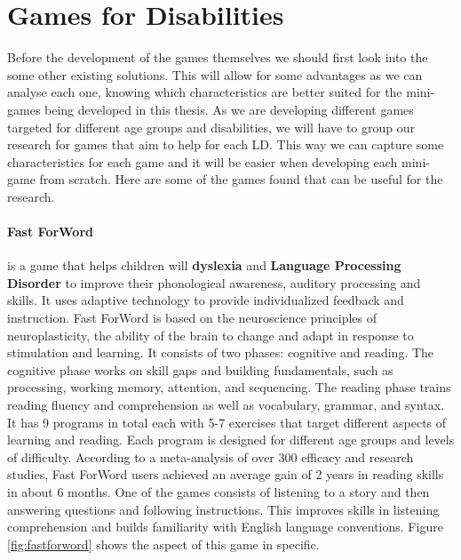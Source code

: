 \section{Games for Disabilities}
\label{sec:gamesforld}

Before the development of the games themselves we should first look into the some other existing solutions. This will allow for some advantages as we can analyse each one, knowing which characteristics are better suited for the mini-games being developed in this thesis.
As we are developing different games targeted for different age groups and disabilities, we will have to group our research for games that aim to help for each LD. This way we can capture some characteristics for each game and it will be easier when developing each mini-game from scratch.
Here are some of the games found that can be useful for the research.

\paragraph{Fast ForWord} is a game that helps children will \textbf{dyslexia} and \textbf{Language Processing Disorder} to improve their phonological awareness, auditory processing and skills. It uses adaptive technology to provide individualized feedback and instruction.
Fast  ForWord is based on the neuroscience principles of neuroplasticity, the ability of the brain to change and adapt in response to stimulation and learning. It consists of two phases: cognitive and reading. The cognitive phase works on skill gaps and building fundamentals, such as processing, working memory, attention, and sequencing. The reading phase trains reading fluency and comprehension as well as vocabulary, grammar, and syntax. It has 9 programs in total each with 5-7 exercises that target different aspects of learning and reading. Each program is designed for different age groups and levels of difficulty.
According to a meta-analysis of over 300 efficacy and research studies, Fast ForWord users achieved an average gain of 2 years in reading skills in about 6 months. \cite{gemlearningFastFor}
One of the games consists of listening to a story and then answering questions and following instructions. This improves skills in listening comprehension and builds familiarity with English language conventions. Figure \ref{fig:fastforword} shows the aspect of this game in specific.


